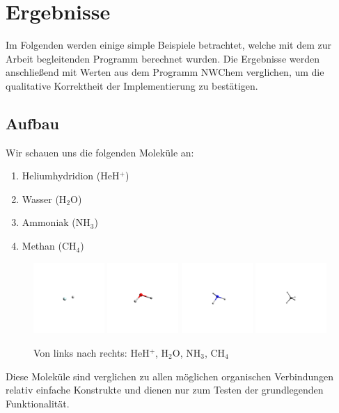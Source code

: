 \chapter{Ergebnisse}
Im Folgenden werden einige simple Beispiele betrachtet,
welche mit dem zur Arbeit begleitenden Programm berechnet wurden.
Die Ergebnisse werden anschließend mit Werten aus dem Programm NWChem \cite{nwchem} verglichen,
um die qualitative Korrektheit der Implementierung zu bestätigen.
\section{Aufbau}
Wir schauen uns die folgenden Moleküle an:
\begin{enumerate}
    \item Heliumhydridion (HeH$^+$)
    \item Wasser (H$_2$O)
    \item Ammoniak (NH$_3$)
    \item Methan (CH$_4$)
\end{enumerate}
\begin{figure}[h]
    \centering
\includegraphics[trim=1400 1400 1400 1400, clip, width=0.24\textwidth]{res/HeH/heh_w.png}
\includegraphics[trim=1400 1400 1400 1400, clip, width=0.24\textwidth]{res/H2O/h2o.png}
\includegraphics[trim=1400 1400 1400 1400, clip, width=0.24\textwidth]{res/NH3/nh3_d.png}
\includegraphics[trim=1400 1400 1400 1400, clip, width=0.24\textwidth]{res/CH4/ch4.png}
\caption{Von links nach rechts: HeH$^+$, H$_2$O, NH$_3$, CH$_4$}\label{molecules}
\end{figure}
Diese Moleküle sind verglichen zu
allen möglichen organischen Verbindungen
relativ einfache Konstrukte und dienen nur zum Testen
der grundlegenden Funktionalität.

